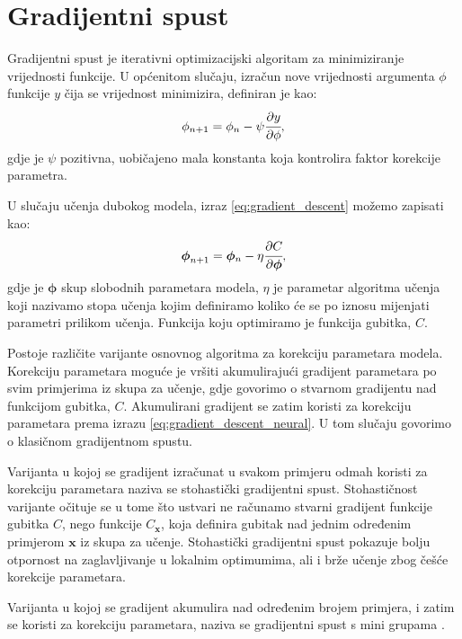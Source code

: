 \documentclass[times, utf8, diplomski, numeric]{fer}
\begin{document}
\section{Gradijentni spust}

Gradijentni spust je iterativni optimizacijski algoritam za minimiziranje vrijednosti funkcije.
U općenitom slučaju, izračun nove vrijednosti argumenta $\phi$ funkcije $y$ čija se vrijednost minimizira, definiran je kao:
\begin{equation}
 \phi_{n+1} = \phi_n - \psi \cfrac{\partial y}{\partial \phi}, \label{eq:gradient_descent}
\end{equation}
gdje je $\psi$ pozitivna, uobičajeno mala konstanta koja kontrolira faktor korekcije parametra.

\noindent U slučaju učenja dubokog modela, izraz \ref{eq:gradient_descent} možemo zapisati kao:
\begin{equation}
 \boldsymbol{\phi}_{n+1} = \boldsymbol{\phi}{_n} - \eta \cfrac{\partial C}{\partial \boldsymbol{\phi}}, \label{eq:gradient_descent_neural}
\end{equation}
gdje je $\boldsymbol{\phi}$ skup slobodnih parametara modela, $\eta$ je parametar algoritma učenja koji nazivamo stopa učenja  kojim definiramo koliko će se po iznosu mijenjati parametri prilikom učenja.
Funkcija koju optimiramo je funkcija gubitka, $C$.

Postoje različite varijante osnovnog algoritma za korekciju parametara modela. 
Korekciju parametara moguće je vršiti akumulirajući gradijent parametara po svim primjerima iz skupa za učenje, gdje govorimo o stvarnom gradijentu nad funkcijom gubitka, $C$. 
Akumulirani gradijent se zatim koristi za korekciju parametara prema izrazu \ref{eq:gradient_descent_neural}. U tom slučaju govorimo o klasičnom gradijentnom spustu.

Varijanta u kojoj se gradijent izračunat u svakom primjeru odmah koristi za korekciju parametara naziva se stohastički gradijentni spust. 
Stohastičnost varijante očituje se u tome što ustvari ne računamo stvarni gradijent funkcije gubitka $C$, nego funkcije $C_\mathbf{x}$, koja definira gubitak nad jednim određenim primjerom $\mathbf{x}$ iz skupa za učenje.
Stohastički gradijentni spust pokazuje bolju otpornost na zaglavljivanje u lokalnim optimumima, ali i brže učenje zbog češće korekcije parametara.

Varijanta u kojoj se gradijent akumulira nad određenim brojem primjera, i zatim se koristi za korekciju parametara, naziva se gradijentni spust s mini grupama  \citep{seminar:rela}.
\end{document}
